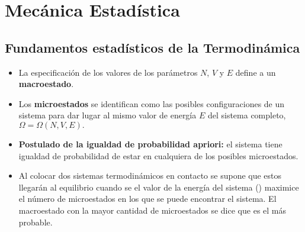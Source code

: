 \chapter{Mecánica Estadística}


\section{Fundamentos estadísticos de la Termodinámica}
\begin{itemize}
	\item La especificación de los valores de los parámetros $N$, $V$ y $E$
	define a un \textbf{macroestado}.
	
	\item Los \textbf{microestados} se identifican como las posibles 
	configuraciones de un sistema para dar lugar al mismo valor 
	de energía $E$ del sistema completo, $\Omega=\Omega(N,V,E).$
	
	\item \textbf{Postulado de la igualdad de probabilidad apriori:} el sistema
	tiene igualdad de probabilidad de estar en cualquiera de los posibles
	microestados.
	
	\item Al colocar dos sistemas termodinámicos en contacto se supone
	que estos llegarán al equilibrio cuando se el valor de la energía
	del sistema () maximice el número 
	de microestados en los que se puede encontrar el sistema.
	El macroestado con la mayor cantidad de microestados 
	se dice que es el más probable.
\end{itemize}